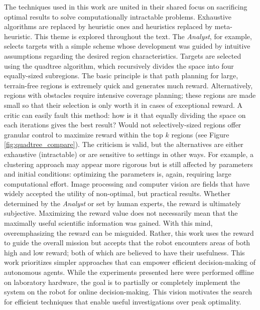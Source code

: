 \documentclass{tamuccthesis}
\begin{document}
The techniques used in this work are united in their shared focus on sacrificing optimal results to solve computationally intractable problems. Exhaustive algorithms are replaced by heuristic ones and heuristics replaced by meta-heuristic. This theme is explored throughout the text. The \textit{Analyst}, for example, selects targets with a simple scheme whose development was guided by intuitive assumptions regarding the desired region characteristics. Targets are selected using the quadtree algorithm, which recursively divides the space into four equally-sized subregions. The basic principle is that path planning for large, terrain-free regions is extremely quick and generates much reward. Alternatively, regions with obstacles require intensive coverage planning; these regions are made small so that their selection is only worth it in cases of exceptional reward. A critic can easily fault this method: how is it that equally dividing the space on each iterations gives the best result? Would not selectively-sized regions offer granular control to maximize reward within the top $k$ regions (see Figure \ref{fig:quadtree_compare}). The criticism is valid, but the alternatives are either exhaustive (intractable) or are sensitive to settings in other ways. For example, a clustering approach may appear more rigorous but is still affected by parameters and initial conditions: optimizing the parameters is, again, requiring large computational effort. Image processing and computer vision are fields that have widely accepted the utility of non-optimal, but practical results. Whether determined by the \textit{Analyst} or set by human experts, the reward is ultimately subjective. Maximizing the reward value does not necessarily mean that the maximally useful scientific information was gained. With this mind, overemphasizing the reward can be misguided. Rather, this work uses the reward to guide the overall mission but accepts that the robot encounters areas of both high and low reward; both of which are believed to have their usefulness. This work prioritizes simpler approaches that can empower efficient decision-making of autonomous agents.  While the experiments presented here were performed offline on laboratory hardware, the goal is to partially or completely implement the system on the robot for online decision-making. This vision motivates the search for efficient techniques that enable useful investigations over peak optimality. 
\end{document}
